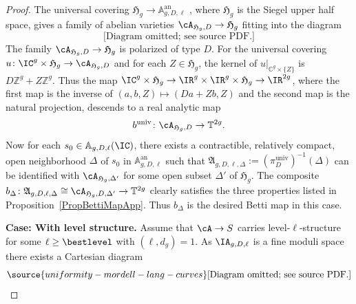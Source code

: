 \begin{proof}
The universal covering $\mathfrak{H}_g \rightarrow \mathbb
A_{g,D,\ell}^{\mathrm{an}}$ \cite[Proposition~1.3.2]{GenestierNgo},
where $\mathfrak{H}_g$ is the Siegel upper half space, gives a family of abelian varieties
$\cA_{\mathfrak{H}_g,D} \rightarrow \mathfrak{H}_g$ %
fitting into the diagram
\[
\text{[Diagram omitted; see source PDF.]}
\]
The family $\cA_{\mathfrak{H}_g,D} \rightarrow \mathfrak{H}_g$ is polarized of type $D$.
For the universal covering
$u \colon \IC^g \times \mathfrak{H}_g \rightarrow \cA_{\mathfrak{H}_g,D}$
and for each $Z\in \mathfrak{H}_g$, the kernel of
$u|_{\mathbb{C}^g \times \{Z\}}$ is $D\mathbb{Z}^g + Z \mathbb{Z}^g$.
Thus the map
$\IC^g \times \mathfrak{H}_g \rightarrow \IR^g \times \IR^g \times \mathfrak{H}_g \rightarrow \IR^{2g}$,
where the first map is the inverse of $(a,b,Z) \mapsto (Da + Z  b,Z)$
and the second map is the natural projection, descends to a real
analytic map
\[
b^{\mathrm{univ}} \colon \cA_{\mathfrak{H}_g,D} \rightarrow \mathbb T^{2g}.
\]
 Now for each $s_0 \in \mathbb A_{g,D,\ell}(\IC)$, there exists a
 contractible, relatively compact, open neighborhood $\Delta$ of $s_0$ in $\mathbb A_{g,D,\ell}^{\mathrm{an}}$ such that $\mathfrak{A}_{g,D,\ell,\Delta}:=(\pi^{\mathrm{univ}}_D)^{-1}(\Delta)$ can be identified with $\cA_{\mathfrak{H}_g,\Delta'}$ for some open subset $\Delta'$ of $\mathfrak{H}_g$. The composite $b_{\Delta} \colon \mathfrak{A}_{g,D,\ell,\Delta} \cong \cA_{\mathfrak{H}_g,D,\Delta'} \rightarrow \mathbb T^{2g}$ clearly  satisfies the three properties listed in Proposition~\ref{PropBettiMapApp}. Thus $b_{\Delta}$ is the desired Betti map in this case.%


  \textbf{Case: With level structure.}
  Assume that $\cA \rightarrow S$ carries level-$\ell$-structure for some $\ell \ge \bestlevel$ with $(\ell,d_g) = 1$.
As $\IA_{g,D,\ell}$ is a fine moduli space there exists a Cartesian diagram
\begin{equation*}%
\source{uniformity-mordell-lang-curves}
\text{[Diagram omitted; see source PDF.]}
\end{equation*}


\end{proof}
